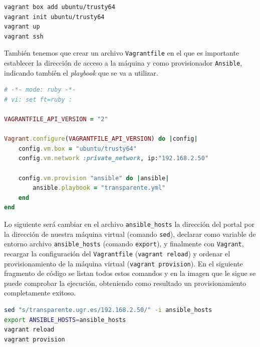 \begin{lstlisting}[language=bash,captionpos=b,caption={Órdenes para crear máquina virtual Vagrant},label={lst:crear_vagrant}]
vagrant box add ubuntu/trusty64
vagrant init ubuntu/trusty64
vagrant up
vagrant ssh
\end{lstlisting}

\newpage
También tenemos que crear un archivo {\tt Vagrantfile} en el que es importante establecer la dirección de acceso a la máquina y como provisionador {\tt Ansible}, indicando también el \textit{playbook} que se va a utilizar.

\begin{lstlisting}[language=Ruby,captionpos=b,caption={Archivo Vagrantfile},label={lst:edit_vgfile}]
# -*- mode: ruby -*-
# vi: set ft=ruby :

VAGRANTFILE_API_VERSION = "2"

Vagrant.configure(VAGRANTFILE_API_VERSION) do |config|
	config.vm.box = "ubuntu/trusty64"
	config.vm.network :private_network, ip:"192.168.2.50"

	config.vm.provision "ansible" do |ansible|
		ansible.playbook = "transparente.yml"
	end
end
\end{lstlisting}

Lo siguiente será cambiar en el archivo {\tt ansible\_hosts} la dirección del portal por la dirección de nuestra máquina virtual (comando {\tt sed}), declarar como variable de entorno archivo {\tt ansible\_hosts} (comando {\tt export}), y finalmente con {\tt Vagrant}, recargar la configuración del {\tt Vagrantfile} ({\tt vagrant reload}) y ordenar el provisionamiento de la máquina virtual ({\tt vagrant provision}). En el siguiente fragmento de código se listan todos estos comandos y en la imagen que le sigue se puede comprobar la ejecución, obteniendo como resultado un provisionamiento completamente exitoso.

\begin{lstlisting}[language=bash,captionpos=b,caption={Órdenes para provisionar máquina Vagrant},label={lst:aprov_vagrant}]
sed "s/transparente.ugr.es/192.168.2.50/" -i ansible_hosts
export ANSIBLE_HOSTS=ansible_hosts
vagrant reload
vagrant provision
\end{lstlisting}

